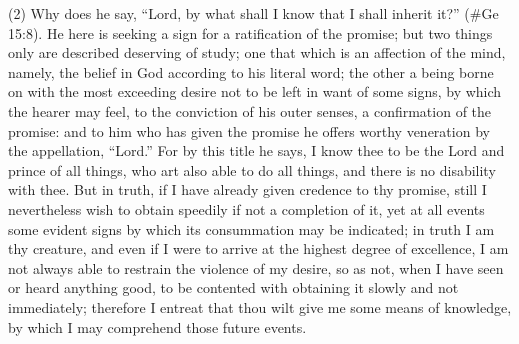 (2) Why does he say, ``Lord, by what shall I know that I shall inherit it?'' (\#Ge 15:8). He here is
seeking a sign for a ratification of the promise; but two things only are described deserving of
study; one that which is an affection of the mind, namely, the belief in God according to his literal
word; the other a being borne on with the most exceeding desire not to be left in want of some
signs, by which the hearer may feel, to the conviction of his outer senses, a confirmation of the
promise: and to him who has given the promise he offers worthy veneration by the appellation,
``Lord.'' For by this title he says, I know thee to be the Lord and prince of all things, who art also able
to do all things, and there is no disability with thee. But in truth, if I have already given credence to
thy promise, still I nevertheless wish to obtain speedily if not a completion of it, yet at all events
some evident signs by which its consummation may be indicated; in truth I am thy creature, and
even if I were to arrive at the highest degree of excellence, I am not always able to restrain the
violence of my desire, so as not, when I have seen or heard anything good, to be contented with
obtaining it slowly and not immediately; therefore I entreat that thou wilt give me some means of
knowledge, by which I may comprehend those future events.

